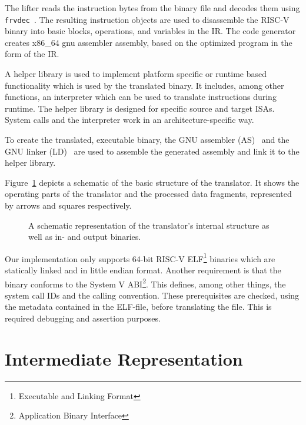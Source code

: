 \documentclass[course=eragp]{aspdoc}
\begin{document}
The lifter reads the instruction bytes from the binary file and decodes them using
\texttt{frvdec}~\cite{frvdec}. The resulting instruction objects are used to disassemble the RISC-V binary
into basic blocks, operations, and variables in the IR. The code generator creates x86\_64
gnu assembler assembly, based on the optimized program in the form of the IR.

\par

A helper library is used to implement platform specific or runtime based
functionality which is used by the translated binary. It includes, among other functions, an interpreter which
can be used to translate instructions during runtime. The helper library is designed for specific
source and target ISAs. System calls and the interpreter work in an architecture-specific way.

\par

To create the translated, executable binary, the GNU assembler (AS)~\cite{gnu_binutils} and the GNU
linker (LD)~\cite{gnu_binutils} are used to assemble the generated assembly and link it to the helper library.

\par

Figure~\ref{fig:program_overview} depicts a schematic of the basic structure of the translator. It shows the
operating parts of the translator and the processed data fragments, represented by arrows and
squares respectively.

\begin{figure}[H]
    \centering
    \caption{A schematic representation of the translator's internal structure as well as in- and
        output binaries.}\label{fig:program_overview}
\end{figure}

\par

Our implementation only supports 64-bit RISC-V ELF\footnote{Executable and Linking Format} binaries
which are statically linked and in little endian format. Another requirement is that the binary
conforms to the System V ABI\footnote{Application Binary Interface}. This defines, among other things, the
system call IDs and the calling convention. These prerequisites are checked, using the metadata
contained in the ELF-file, before translating the file. This is required debugging and assertion purposes.

\section{Intermediate Representation}\label{sec:ir}
\end{document}

